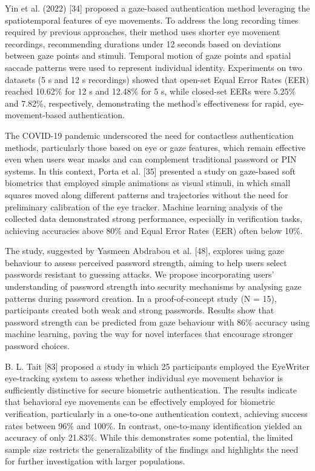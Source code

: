 \documentclass{article}
\begin{document}
Yin et al. (2022) [34] proposed a gaze-based authentication method leveraging the spatiotemporal features of eye movements.
To address the long recording times required by previous approaches, their method uses shorter eye movement recordings, recommending durations under 12 seconds based on deviations between gaze points and stimuli.
Temporal motion of gaze points and spatial saccade patterns were used to represent individual identity.
Experiments on two datasets (5 s and 12 s recordings) showed that open-set Equal Error Rates (EER) reached 10.62\% for 12 s and 12.48\% for 5 s, while closed-set EERs were 5.25\% and 7.82\%, respectively, demonstrating the method's effectiveness for rapid, eye-movement-based authentication.

The COVID-19 pandemic underscored the need for contactless authentication methods, particularly those based on eye or gaze features, which remain effective even when users wear masks and can complement traditional password or PIN systems. 
In this context, Porta et al. [35] presented a study on gaze-based soft biometrics that employed simple animations as visual stimuli, in which small squares moved along different patterns and trajectories without the need for preliminary calibration of the eye tracker. 
Machine learning analysis of the collected data demonstrated strong performance, especially in verification tasks, achieving accuracies above 80\% and Equal Error Rates (EER) often below 10\%.

The study, suggested by Yasmeen Abdrabou et al. [48], explores using gaze behaviour to assess perceived password strength, aiming to help users select passwords resistant to guessing attacks. 
We propose incorporating users' understanding of password strength into security mechanisms by analysing gaze patterns during password creation.
In a proof-of-concept study (N = 15), participants created both weak and strong passwords.
Results show that password strength can be predicted from gaze behaviour with 86\% accuracy using machine learning, paving the way for novel interfaces that encourage stronger password choices.

B. L. Tait [83] proposed a study in which 25 participants employed the EyeWriter eye-tracking system to assess whether individual eye movement behavior is sufficiently distinctive for secure biometric authentication.
The results indicate that behavioral eye movements can be effectively employed for biometric verification, particularly in a one-to-one authentication context, achieving success rates between 96\% and 100\%.
In contrast, one-to-many identification yielded an accuracy of only 21.83\%. 
While this demonstrates some potential, the limited sample size restricts the generalizability of the findings and highlights the need for further investigation with larger populations.
\end{document}
